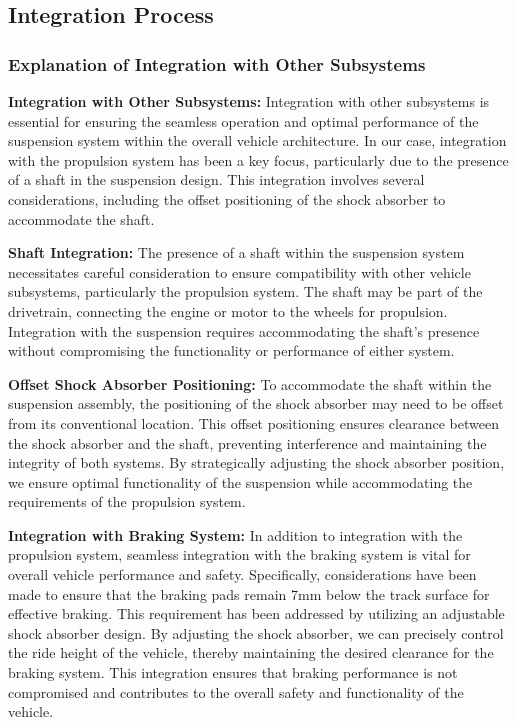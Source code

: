 \subsection{Integration Process}
\subsubsection{Explanation of Integration with Other Subsystems}
\textbf{Integration with Other Subsystems:} Integration with other subsystems is essential for ensuring the seamless operation and optimal performance of the suspension system within the overall vehicle architecture. In our case, integration with the propulsion system has been a key focus, particularly due to the presence of a shaft in the suspension design. This integration involves several considerations, including the offset positioning of the shock absorber to accommodate the shaft.

\textbf{Shaft Integration:} The presence of a shaft within the suspension system necessitates careful consideration to ensure compatibility with other vehicle subsystems, particularly the propulsion system. The shaft may be part of the drivetrain, connecting the engine or motor to the wheels for propulsion. Integration with the suspension requires accommodating the shaft's presence without compromising the functionality or performance of either system.

\textbf{Offset Shock Absorber Positioning:} To accommodate the shaft within the suspension assembly, the positioning of the shock absorber may need to be offset from its conventional location. This offset positioning ensures clearance between the shock absorber and the shaft, preventing interference and maintaining the integrity of both systems. By strategically adjusting the shock absorber position, we ensure optimal functionality of the suspension while accommodating the requirements of the propulsion system.

\textbf{Integration with Braking System:} In addition to integration with the propulsion system, seamless integration with the braking system is vital for overall vehicle performance and safety. Specifically, considerations have been made to ensure that the braking pads remain 7mm below the track surface for effective braking. This requirement has been addressed by utilizing an adjustable shock absorber design. By adjusting the shock absorber, we can precisely control the ride height of the vehicle, thereby maintaining the desired clearance for the braking system. This integration ensures that braking performance is not compromised and contributes to the overall safety and functionality of the vehicle.

